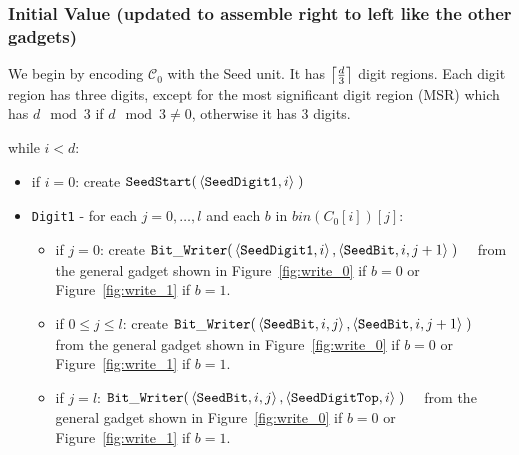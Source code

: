 \subsubsection{Initial Value (updated to assemble right to left like the other gadgets)}
    We begin by encoding $\mathcal{C}_0$ with the Seed unit. It has $\ceil*{\frac{d}{3}}$ digit regions.
    Each digit region has three digits, except for the most significant digit region (MSR) which has $d \mod 3$
    if $d \mod 3 \not= 0$, otherwise it has 3 digits.


while $i < d$:

\begin{itemize}
    \item if $i = 0$: create
    $\begin{aligned}[t]
        {\tt SeedStart}(&\left\langle {\tt SeedDigit1}, i \right\rangle \; )
    \end{aligned}$

    \item {\tt Digit1} - for each $j=0,\ldots,l$ and each $b$ in $bin(C_0[i])[j]$:
    \begin{itemize}
        \item if $j = 0$: create
        $\begin{aligned}[t]
            \dwriter(&\left\langle {\tt SeedDigit1}, i \right\rangle, \left\langle {\tt SeedBit}, i, j + 1 \right\rangle \;)
        \end{aligned}$ from the general gadget shown in Figure~\ref{fig:write_0} if $b = 0$ or Figure~\ref{fig:write_1} if $b = 1$.

        \item if $0 \leqslant j \leqslant l$: create
        $\begin{aligned}[t]
            \dwriter(&\left\langle {\tt SeedBit}, i, j \right\rangle, \left\langle {\tt SeedBit}, i, j + 1 \right\rangle \;)
        \end{aligned}$ from the general gadget shown in Figure~\ref{fig:write_0} if $b = 0$ or Figure~\ref{fig:write_1} if $b = 1$.

        \item if $j = l$:
        $\begin{aligned}[t]
            \dwriter(&\left\langle {\tt SeedBit}, i, j \right\rangle, \left\langle {\tt SeedDigitTop}, i \right\rangle \;)
        \end{aligned}$ from the general gadget shown in Figure~\ref{fig:write_0} if $b = 0$ or Figure~\ref{fig:write_1} if $b = 1$.
    \end{itemize}



\end{itemize}

